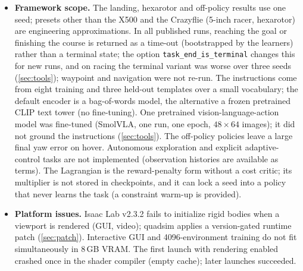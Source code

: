 \documentclass[11pt,a4paper]{article}
\begin{document}
\begin{itemize}
evaluation noise, not seed-to-seed variability --- which the replication showed to be large for some results (figure-8
racing 67--79\,\%, held-out phrasings after DAgger 56--84\,\%). Swarm confidence intervals treat the four agents
of a group as independent episodes, which they are not. Classical baselines use
reasonable default gains, not systematically tuned gains, so the reported margins are upper bounds of the RL advantage.
\item \textbf{Framework scope.} The landing, hexarotor and off-policy results use one seed; presets other than the
X500 and the Crazyflie (5-inch racer, hexarotor) are engineering approximations. In all published runs, reaching the
goal or finishing the course is returned as a time-out (bootstrapped by the learners) rather than a terminal state;
the option \texttt{task\_end\_is\_terminal} changes this for new runs, and on racing the terminal variant was worse
over three seeds (\cref{sec:tools}); waypoint and navigation were not re-run. The
instructions come from eight training and three held-out templates over a small vocabulary; the default encoder is
a bag-of-words model, the alternative a frozen pretrained CLIP text tower (no fine-tuning). One pretrained
vision-language-action model was fine-tuned (SmolVLA, one run, one epoch, $48\times64$ images); it did not ground
the instructions (\cref{sec:tools}). The off-policy policies leave a
large final yaw error on hover. Autonomous exploration and explicit adaptive-control tasks are not implemented (observation histories are
available as terms). The Lagrangian is the reward-penalty form without a cost critic; its multiplier is not stored
in checkpoints, and it can lock a seed into a policy that never learns the task (a constraint warm-up is provided).
\item \textbf{Platform issues.} Isaac Lab v2.3.2 fails to initialize rigid bodies when a viewport is rendered
(GUI, video); quadsim applies a version-gated runtime patch (\cref{sec:patch}). Interactive GUI and 4096-environment
training do not fit simultaneously in 8\,GB VRAM. The first launch with rendering enabled crashed once in the shader
compiler (empty cache); later launches succeeded.
\end{itemize}
\end{document}

